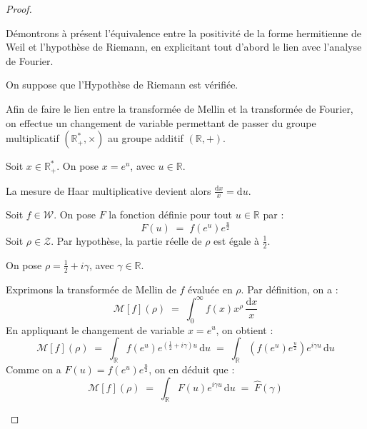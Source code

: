 \documentclass[Riemann_Hypothesis.tex]{subfiles}
\begin{document}
\begin{proof}
    \begin{part_proof}
        Démontrons à présent l'équivalence entre
        la positivité de la forme hermitienne de Weil et l'hypothèse de Riemann,
        en explicitant tout d'abord le lien avec
        l'analyse de Fourier. \medskip\par
        On suppose que l'Hypothèse de Riemann est vérifiée. \par
        Afin de faire le lien entre la transformée de Mellin et la transformée de Fourier, on effectue un changement de variable permettant de passer du groupe multiplicatif $\left(\mathbb{R}_+^*, \times\right)$ au groupe additif $\left(\mathbb{R}, +\right)$. \par
        Soit $x \in \mathbb{R}_+^*$. On pose $x = e^u$, avec $u \in \mathbb{R}$. \par
        La mesure de Haar multiplicative devient alors $\frac{\mathrm{d}x}{x} = \mathrm{d}u$. \par
        Soit $f \in \mathcal{W}$. On pose $F$ la fonction définie pour tout $u \in \mathbb{R}$ par :
        \begin{equation*}
            F(u) \;=\; f\left(e^u\right) e^{\frac{u}{2}}
        \end{equation*}
        Soit $\rho \in \mathcal{Z}$. Par hypothèse, la partie réelle de $\rho$ est égale à $\frac{1}{2}$. \par
        On pose $\rho = \frac{1}{2} + i\gamma$, avec $\gamma \in \mathbb{R}$. \par
        Exprimons la transformée de Mellin de $f$ évaluée en $\rho$. Par définition, on a :
        \begin{equation*}
            \mathcal{M}[f](\rho) \;=\; \int_{0}^{\infty} f(x) x^{\rho} \, \frac{\mathrm{d}x}{x}
        \end{equation*}
        En appliquant le changement de variable $x = e^u$, on obtient :
        \begin{equation*}
            \mathcal{M}[f](\rho) \;=\;
            \int_{\mathbb{R}} f\left(e^u\right)
            e^{\left(\frac{1}{2} + i\gamma\right)u} \, \mathrm{d}u \;=\;
            \int_{\mathbb{R}} \left( f\left(e^u\right) e^{\frac{u}{2}} \right) e^{i\gamma u} \, \mathrm{d}u
        \end{equation*}
        Comme on a $F(u) = f(e^u) e^{\frac{u}{2}}$, on en déduit que :
        \begin{equation*}
            \mathcal{M}[f](\rho) \;=\;
            \int_{\mathbb{R}} F(u) e^{i\gamma u} \, \mathrm{d}u \;=\; \hat{F}(\gamma)

\end{equation*}
\end{part_proof}
\end{proof}
\end{document}
